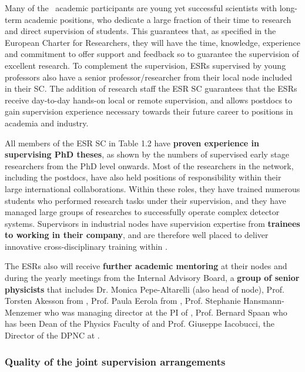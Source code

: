 Many of the \acronym\ academic participants are young yet successful scientists with long-term academic positions, who dedicate a large fraction of their time to research and direct supervision of students. 
This guarantees that, as specified in the European Charter for Researchers, they will have the time, knowledge, experience and commitment to offer support and feedback so to guarantee the supervision of excellent research. 
To complement the supervision, ESRs supervised by young professors also have a senior professor/researcher from their local node included in their SC.
The addition of research staff the ESR SC guarantees that the ESRs receive day-to-day hands-on local or remote supervision, and allows \acronym postdocs to gain supervision experience necessary towards their future career to positions in academia and industry. 

All members of the ESR SC in Table 1.2 have \textbf{proven experience in supervising PhD theses}, as shown by the numbers of supervised early stage researchers from the PhD level onwards. 
Most of the researchers in the network, including the postdocs, have also held positions of responsibility within their large international collaborations. 
Within these roles, they have trained numerous students who performed research tasks under their supervision, and they have managed large groups of researches to successfully operate complex detector systems. 
Supervisors in industrial nodes have supervision expertise from \textbf{trainees to working in their company}, and are therefore well placed to deliver innovative cross-disciplinary training within \acronym. 

The ESRs also will receive \textbf{further academic mentoring} at their nodes and during the yearly meetings from the Internal Advisory Board, a \textbf{group of senior physicists} that includes Dr. Monica Pepe-Altarelli (also head of \cern node), Prof. Torsten Akesson from \lundentity, Prof. Paula Eerola from \helsinkientity, Prof. Stephanie Hansmann- Menzemer who was managing director at the PI of \heidelbergentity, Prof. Bernard Spaan who has been Dean of the Physics Faculty of \dortmund and Prof. Giuseppe Iacobucci, the Director of the DPNC at \unigeentity. 


\vskip-10pt

\subsubsection{Quality of the joint supervision arrangements}
\label{sec:jointsuperqual}

